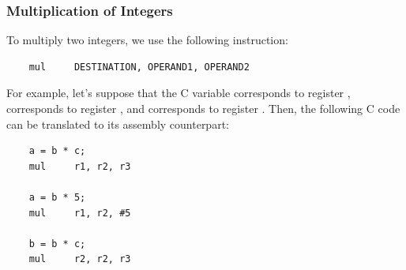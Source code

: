 \documentclass[letterpaper]{article}
\begin{document}
\subsubsection{Multiplication of Integers}
To multiply two integers, we use the following instruction: 
\begin{verbatim}
    mul     DESTINATION, OPERAND1, OPERAND2
\end{verbatim}
For example, let's suppose that the C variable  corresponds to register ,  corresponds to register , and  corresponds to register . Then, the following C code can be translated to its assembly counterpart:
\begin{verbatim}
    a = b * c; 
    mul     r1, r2, r3

    a = b * 5;
    mul     r1, r2, #5 

    b = b * c;
    mul     r2, r2, r3
\end{verbatim}
\end{document}
